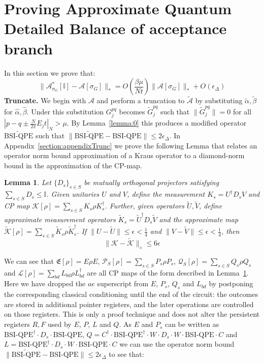 \documentclass[aps,floatfix,10pt,amssymb,amsfont,amsmath,superscriptaddress,float,nofootinbib,longbibliography,nobalancelastpage,twocolumn]{revtex4-2}
\newtheorem{lemma}{Lemma}
\begin{document}

\appendix
\onecolumngrid    
\section{Proving Approximate Quantum Detailed Balance of acceptance branch}
\label{appendix:Aproof}
In this section we prove that:
\begin{equation}
    \|\mathcal{A}^*_{\sigma_G}[\mathbb{I}] - \mathcal{A}[\sigma_G]\|_* = O\!\left(\frac{\beta\mu}{Nt}\right)\|\mathcal{A}[\sigma_G]\|_* + O\!\left(\epsilon_{\Delta}\right)
\end{equation}
\textbf{Truncate.} We begin with $\mathcal{A}$ and perform a truncation to $\tilde{\mathcal{A}}$ by substituting $\tilde \alpha, \tilde \beta$ for $\hat \alpha, \hat \beta$. Under this substitution $G^{pq}_j$ becomes $\tilde G^{pq}_j$ such that $\|\tilde G^{pq}_j\| =0$ for all $|p-q\pm\frac{N}{2\pi}E_jt|_{N} > \mu$.  By Lemma~\ref{lemma:0} this produces a modified operator $\widetilde{\text{BSI-QPE}}$ such that $\|\widetilde{\text{BSI-QPE}}- \text{BSI-QPE}\| \leq 2\epsilon_{\Delta}$. In Appendix~\ref{section:appendixTrunc} we prove the following Lemma that relates an operator norm bound approximation of a Kraus operator to a diamond-norm bound in the approximation of the CP-map.
\begin{lemma}
\label{lemma:3}
Let $\{D_s\}_{s\in S}$ be mutually orthogonal projectors satisfying $\sum_{s\in S} D_s \leq \mathbb{I}$. Given unitaries $U$ and $V$, define the measurement $K_s = U^{\dagger}D_s V$ and CP map $\mathcal{K}[\rho] = \sum_{s \in S} K_s\rho K_s^{\dagger}$. Further, given operators $\tilde U, \tilde V$, define approximate measurement operators $\tilde K_s = \tilde U^{\dagger}D_s \tilde V$ and the approximate map $\tilde{\mathcal{K}}[\rho] = \sum_{s \in S} \tilde K_s\rho \tilde K_s^{\dagger}$. If $\|U-\tilde U\| \leq \epsilon<\frac14$ and $\|V-\tilde V\| \leq \epsilon<\frac14$, then 
\begin{equation}
    \|\mathcal{K} - \tilde{\mathcal{K}}\|_{\diamond} \leq 6\epsilon
\end{equation}
\end{lemma}
We can see that $\mathfrak{E}[\rho] =  E \rho E$, $\mathcal{P}_S[\rho] = \sum_{s\in S} P_s \rho P_s$, $\mathcal{Q}_S[\rho] = \sum_{s\in S} Q_s \rho Q_s$ and $\mathcal{L}[\rho] = \sum_{bd} L_{bd} \rho L^{\dagger}_{bd}$ are all CP maps of the form described in Lemma~\ref{lemma:3}. Here we have dropped the $ae$ superscript from $E$, $P_s$, $Q_s$ and $L_{bd}$ by postponing the corresponding classical conditioning until the end of the circuit: the outcomes are stored in additional pointer registers, and the later operations are controlled on those registers. This is only a proof technique and does not alter the persistent registers $R, F$ used by $E$, $P$, $L$ and $Q$. As $E$ and $P_s$ can be written as $\text{BSI-QPE}^{\dagger}\cdot D_s\cdot\text{BSI-QPE}$, $Q = C^{\dagger}\cdot\text{BSI-QPE}^{\dagger}\cdot W\cdot D_s\cdot W\cdot \text{BSI-QPE}\cdot C$ and $L = \text{BSI-QPE}^{\dagger}\cdot D_s\cdot W\cdot \text{BSI-QPE}\cdot C$ we can use the operator norm bound $\|\widetilde{\text{BSI-QPE}}- \text{BSI-QPE}\| \leq 2\epsilon_{\Delta}$ to see that:
\end{document}

